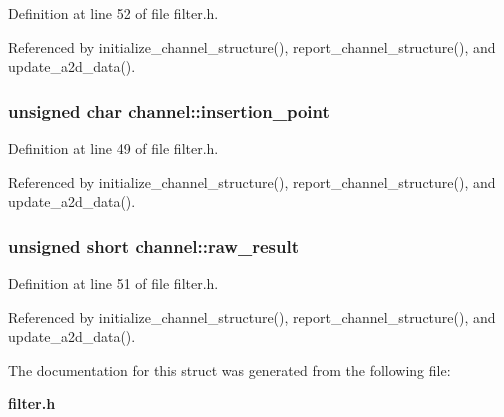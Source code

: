 Definition at line 52 of file filter.h.

Referenced by initialize\_\-channel\_\-structure(), report\_\-channel\_\-structure(), and update\_\-a2d\_\-data().
\subsubsection{\setlength{\rightskip}{0pt plus 5cm}unsigned char {\bf channel::insertion\_\-point}}\label{structchannel_o0}




Definition at line 49 of file filter.h.

Referenced by initialize\_\-channel\_\-structure(), report\_\-channel\_\-structure(), and update\_\-a2d\_\-data().
\subsubsection{\setlength{\rightskip}{0pt plus 5cm}unsigned short {\bf channel::raw\_\-result}}\label{structchannel_o2}




Definition at line 51 of file filter.h.

Referenced by initialize\_\-channel\_\-structure(), report\_\-channel\_\-structure(), and update\_\-a2d\_\-data().

The documentation for this struct was generated from the following file:\begin{CompactItemize}
\item 
{\bf filter.h}\end{CompactItemize}
